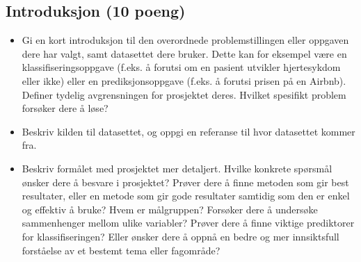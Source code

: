 \subsection{Introduksjon (10 poeng)}\label{introduksjon-10-poeng}

\begin{itemize}
\item
  Gi en kort introduksjon til den overordnede problemstillingen eller
  oppgaven dere har valgt, samt datasettet dere bruker. Dette kan for
  eksempel være en klassifiseringsoppgave (f.eks. å forutsi om en
  pasient utvikler hjertesykdom eller ikke) eller en prediksjonsoppgave
  (f.eks. å forutsi prisen på en Airbnb). Definer tydelig avgrensningen
  for prosjektet deres. Hvilket spesifikt problem forsøker dere å løse?
\item
  Beskriv kilden til datasettet, og oppgi en referanse til hvor
  datasettet kommer fra.
\item
  Beskriv formålet med prosjektet mer detaljert. Hvilke konkrete
  spørsmål ønsker dere å besvare i prosjektet? Prøver dere å finne
  metoden som gir best resultater, eller en metode som gir gode
  resultater samtidig som den er enkel og effektiv å bruke? Hvem er
  målgruppen? Forsøker dere å undersøke sammenhenger mellom ulike
  variabler? Prøver dere å finne viktige prediktorer for
  klassifiseringen? Eller ønsker dere å oppnå en bedre og mer
  innsiktsfull forståelse av et bestemt tema eller fagområde?
\end{itemize}
